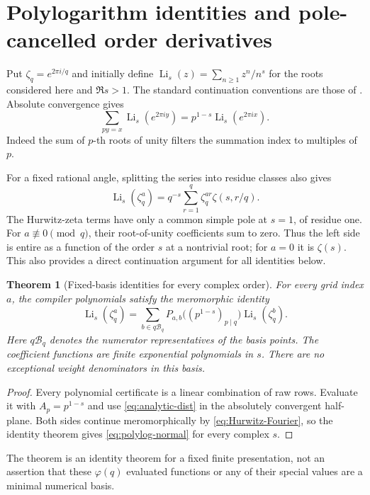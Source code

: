 \documentclass[11pt]{article}
\numberwithin{equation}{section}
\newtheorem{theorem}{Theorem}[section]
\theoremstyle{definition}
\theoremstyle{remark}
\DeclareMathOperator{\Li}{Li}
\newcommand{\B}{\mathcal B}
\begin{document}
\section{Polylogarithm identities and pole-cancelled order derivatives}
\label{sec:polylog}
Put $\zeta_q=e^{2\pi i/q}$ and initially define
$\Li_s(z)=\sum_{n\ge1}z^n/n^s$ for the roots considered here and
$\Re s>1$. The standard continuation conventions are those of
\cite{DLMFpolylog,DLMFhurwitz}. Absolute convergence gives
\begin{equation}
 \sum_{py=x}\Li_s(e^{2\pi i y})
       =p^{1-s}\Li_s(e^{2\pi i x}).
 \label{eq:analytic-dist}
\end{equation}
Indeed the sum of $p$-th roots of unity filters the summation index to
multiples of $p$.

For a fixed rational angle, splitting the series into residue classes
also gives
\begin{equation}
 \Li_s(\zeta_q^a)=q^{-s}\sum_{r=1}^{q}\zeta_q^{ar}
                         \zeta(s,r/q).
 \label{eq:Hurwitz-Fourier}
\end{equation}
The Hurwitz-zeta terms have only a common simple pole at $s=1$, of
residue one. For $a\not\equiv0\pmod q$, their root-of-unity coefficients
sum to zero. Thus the left side is entire as a function of the order
$s$ at a nontrivial root; for $a=0$ it is $\zeta(s)$. This also provides
a direct continuation argument for all identities below.

\begin{theorem}[Fixed-basis identities for every complex order]
\label{thm:all-order}
For every grid index $a$, the compiler polynomials satisfy the
meromorphic identity
\begin{equation}
 \Li_s(\zeta_q^a)=
 \sum_{b\in q\B_q}P_{a,b}\bigl((p^{1-s})_{p\mid q}\bigr)
                         \Li_s(\zeta_q^b).
 \label{eq:polylog-normal}
\end{equation}
Here $q\B_q$ denotes the numerator representatives of the basis points.
The coefficient functions are finite exponential polynomials in $s$.
There are no exceptional weight denominators in this basis.
\end{theorem}
\begin{proof}
Every polynomial certificate is a linear combination of raw rows.
Evaluate it with $A_p=p^{1-s}$ and use \eqref{eq:analytic-dist} in the
absolutely convergent half-plane. Both sides continue meromorphically
by \eqref{eq:Hurwitz-Fourier}, so the identity theorem gives
\eqref{eq:polylog-normal} for every complex $s$.
\end{proof}
The theorem is an identity theorem for a fixed finite presentation, not
an assertion that these $\varphi(q)$ evaluated functions or any of their
special values are a minimal numerical basis.
\end{document}
